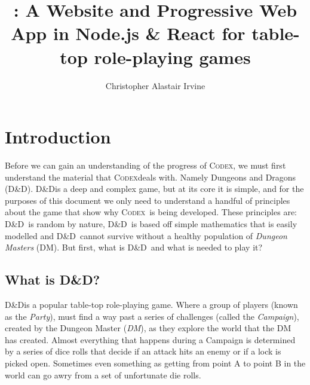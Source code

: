 \documentclass[progress]{cmpreport}
\title{\Codex: A Website and Progressive Web App in Node.js \& React for table-top role-playing games}
\author{Christopher Alastair Irvine}
\newcommand{\dnd}{D\&D}
\newcommand{\Codex}{\textsc{Codex}}
\begin{document}
	\section{Introduction} \label{sec:intro}
	Before we can gain an understanding of the progress of \Codex, we must first understand the material that \Codex deals with. Namely Dungeons and Dragons (\dnd). \dnd is a deep and complex game, but at its core it is simple, and for the purposes of this document we only need to understand a handful of principles about the game that show why \Codex \ is being developed. These principles are: \dnd \ is random by nature, \dnd \ is based off simple mathematics that is easily modelled and \dnd \ cannot survive without a healthy population of \emph{Dungeon Masters} (DM). But first, what is \dnd \ and what is needed to play it? 
	
	\subsection{What is \dnd?}
	\dnd is a popular table-top role-playing game. Where a group of players (known as the \emph{Party}), must find a way past a series of challenges (called the \emph{Campaign}), created by the Dungeon Master (\emph{DM}), as they explore the world that the DM has created. Almost everything that happens during a Campaign is determined by a series of dice rolls that decide if an attack hits an enemy or if a lock is picked open. Sometimes even something as getting from point A to point B in the world can go awry from a set of unfortunate die rolls.
	
\end{document}
